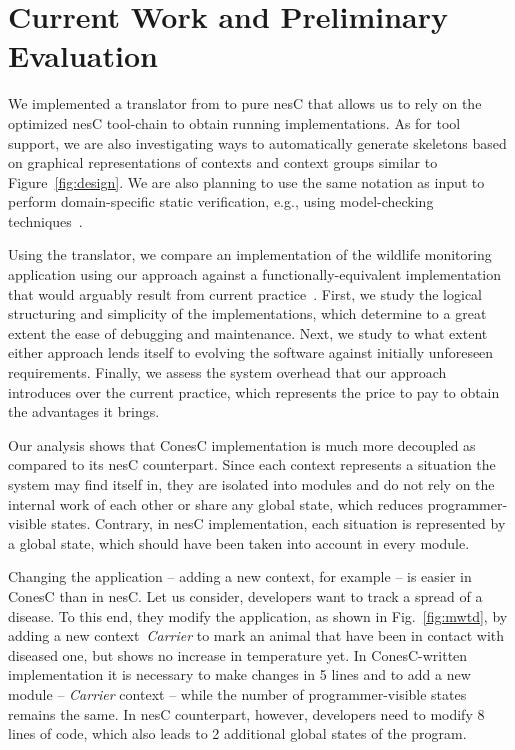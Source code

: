 \section{Current Work and Preliminary Evaluation}
\label{sec:eval}

We implemented a translator from \conesc to pure nesC that allows us
to rely on the optimized nesC tool-chain to obtain running
implementations. As for tool support, we are also investigating ways
to automatically generate \conesc skeletons based on graphical
representations of contexts and context groups similar to
Figure~\ref{fig:design}. We are also planning to use the same notation
as input to perform domain-specific static verification, e.g., using
model-checking techniques~\cite{mottolaicse}.

Using the translator, we compare an implementation of the wildlife
monitoring application using our approach against a
functionally-equivalent implementation that would arguably result from
current practice~\cite{programmingsurvey,badgersEWSN}. First, we study
the logical structuring and simplicity of the implementations, which
determine to a great extent the ease of debugging and
maintenance. Next, we study to what extent either approach lends
itself to evolving the software against initially unforeseen
requirements. Finally, we assess the system overhead that our approach
introduces over the current practice, which represents the price to
pay to obtain the advantages it brings.


Our analysis shows that ConesC implementation is much more decoupled as
compared to its nesC counterpart. Since each context represents a situation
the system may find itself in, they are isolated into modules and do not rely
on the internal work of each other or share any global state, which reduces
programmer-visible states. Contrary, in nesC implementation, each situation
is represented by a global state, which should have been taken into account
in every module.


Changing the application -- adding a new context, for example -- is easier in
ConesC than in nesC. Let us consider, developers want to track a spread of a
disease. To this end, they modify the application, as shown in Fig.~\ref{fig:mwtd},
by adding a new context~\emph{Carrier} to mark an animal that have been in
contact with diseased one, but shows no increase in temperature yet. In
ConesC-written implementation it is necessary to make changes in 5 lines and
to add a new module -- \emph{Carrier} context -- while the number of
programmer-visible states remains the same. In nesC counterpart, however,
developers need to modify 8 lines of code, which also leads to 2 additional
global states of the program.


